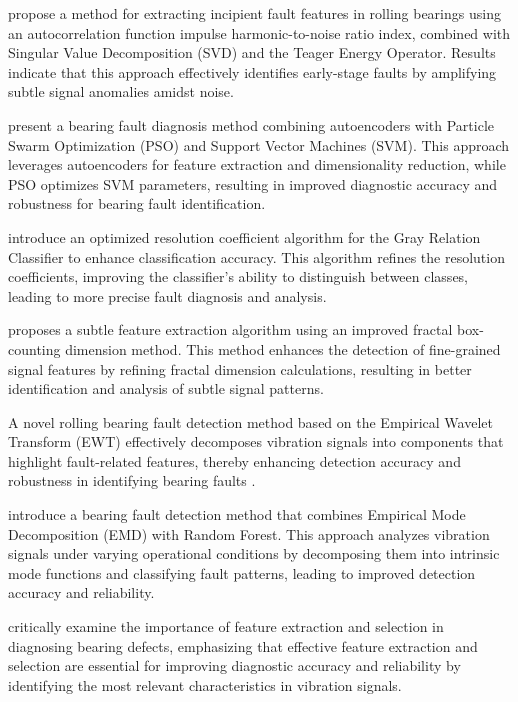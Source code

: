 \documentclass[sn-basic,pdflatex]{sn-jnl}
\theoremstyle{remark}
\theoremstyle{definition}
\begin{document}
\citet{WOS:000416794600016} propose a method for extracting incipient
fault features in rolling bearings using an autocorrelation function
impulse harmonic-to-noise ratio index, combined with Singular Value
Decomposition (SVD) and the Teager Energy Operator. Results indicate
that this approach effectively identifies early-stage faults by
amplifying subtle signal anomalies amidst noise.

\citet{WOS:000484465800028} present a bearing fault diagnosis method
combining autoencoders with Particle Swarm Optimization (PSO) and
Support Vector Machines (SVM). This approach leverages autoencoders for
feature extraction and dimensionality reduction, while PSO optimizes SVM
parameters, resulting in improved diagnostic accuracy and robustness for
bearing fault identification.

\citet{WOS:000477760600037} introduce an optimized resolution
coefficient algorithm for the Gray Relation Classifier to enhance
classification accuracy. This algorithm refines the resolution
coefficients, improving the classifier's ability to distinguish between
classes, leading to more precise fault diagnosis and analysis.

\citet{WOS:000477760600061} proposes a subtle feature extraction
algorithm using an improved fractal box-counting dimension method. This
method enhances the detection of fine-grained signal features by
refining fractal dimension calculations, resulting in better
identification and analysis of subtle signal patterns.

A novel rolling bearing fault detection method based on the Empirical
Wavelet Transform (EWT) effectively decomposes vibration signals into
components that highlight fault-related features, thereby enhancing
detection accuracy and robustness in identifying bearing faults
\citep{WOS:000467079500501}.

\citet{WOS:000459864800144} introduce a bearing fault detection method
that combines Empirical Mode Decomposition (EMD) with Random Forest.
This approach analyzes vibration signals under varying operational
conditions by decomposing them into intrinsic mode functions and
classifying fault patterns, leading to improved detection accuracy and
reliability.

\citet{WOS:000458657500187} critically examine the importance of feature
extraction and selection in diagnosing bearing defects, emphasizing that
effective feature extraction and selection are essential for improving
diagnostic accuracy and reliability by identifying the most relevant
characteristics in vibration signals.
\end{document}
